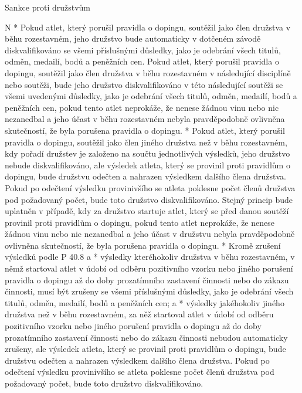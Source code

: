 \secc Sankce proti družstvům

\begitems \style N
* Pokud atlet, který porušil pravidla o dopingu, soutěžil jako člen družstva v běhu rozestavném, jeho družstvo bude automaticky v dotčeném závodě diskvalifikováno se všemi příslušnými důsledky, jako je odebrání všech titulů, odměn, medailí, bodů a peněžních cen.  Pokud atlet, který porušil pravidla o dopingu, soutěžil jako člen družstva v běhu rozestavném v následující disciplíně nebo soutěži, bude jeho družstvo diskvalifikováno v této následující soutěži se všemi uvedenými důsledky, jako je odebrání všech titulů, odměn, medailí, bodů a peněžních cen, pokud tento atlet neprokáže, že nenese žádnou vinu nebo nic nezanedbal a jeho účast v běhu rozestavném nebyla pravděpodobně ovlivněna skutečností, že byla porušena pravidla o dopingu.
* Pokud atlet, který porušil pravidla o dopingu, soutěžil jako člen jiného družstva než v běhu rozestavném, kdy pořadí družstev je založeno na součtu jednotlivých výsledků, jeho družstvo nebude diskvalifikováno, ale výsledek atleta, který se provinil proti pravidlům o dopingu, bude družstvu odečten a nahrazen výsledkem dalšího člena družstva. Pokud po odečtení výsledku provinivšího se atleta poklesne počet členů družstva pod požadovaný počet, bude toto družstvo diskvalifikováno. Stejný princip bude uplatněn v případě, kdy za družstvo startuje atlet, který se před danou soutěží provinil proti pravidlům o dopingu, pokud tento atlet neprokáže, že nenese žádnou vinu nebo nic nezanedbal a jeho účast v družstvu nebyla pravděpodobně ovlivněna skutečností, že byla porušena pravidla o dopingu.
* Kromě zrušení výsledků podle P 40.8
  \begitems \style a
  * výsledky kteréhokoliv družstva v běhu rozestavném, v němž startoval atlet v údobí od odběru pozitivního vzorku nebo jiného porušení pravidla o dopingu až do doby prozatímního zastavení činnosti nebo do zákazu činnosti, musí být zrušeny se všemi příslušnými důsledky, jako je odebrání všech titulů, odměn, medailí, bodů a peněžních cen; a
  * výsledky jakéhokoliv jiného družstva než v běhu rozestavném, za něž startoval atlet v údobí od odběru pozitivního vzorku nebo jiného porušení pravidla o dopingu až do doby prozatímního zastavení činnosti nebo do zákazu činnosti nebudou automaticky zrušeny, ale výsledek atleta, který se provinil proti pravidlům o dopingu, bude družstvu odečten a nahrazen výsledkem dalšího člena družstva. Pokud po odečtení výsledku provinivšího se atleta poklesne počet členů družstva pod požadovaný počet, bude toto družstvo diskvalifikováno.
  \enditems
\enditems

